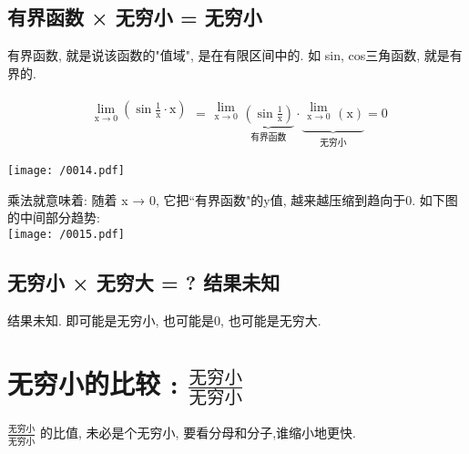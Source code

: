 \documentclass[UTF8]{ctexart}
\begin{document}
\subsection{有界函数 × 无穷小 = 无穷小 } 

有界函数, 就是说该函数的"值域", 是在有限区间中的. 如 sin, cos三角函数, 就是有界的.

\begin{myEnvSample}
	\begin{align*}  %
		\begin{matrix}
			\lim_{\text{x}\rightarrow 0}\left( \sin \frac{1}{\text{x}}\cdot \text{x} \right)\\
		\end{matrix}=\begin{matrix}
			\lim_{\text{x}\rightarrow 0}\\
		\end{matrix}\underset{\text{有界函数}}{\underbrace{\left( \sin \frac{1}{\text{x}} \right) }}\cdot \underset{\text{无穷小}}{\underbrace{\begin{matrix}
					\lim_{\text{x}\rightarrow 0}\\
				\end{matrix}\left( \text{x} \right) }}=0 
	\end{align*}
	
	\texttt{[image: /0014.pdf]}
	
	乘法就意味着: 随着 x → 0, 它把``有界函数"的y值, 越来越压缩到趋向于0. 如下图的中间部分趋势: \\
	
	\texttt{[image: /0015.pdf]}
\end{myEnvSample}


\subsection{无穷小 × 无穷大 = ?  结果未知} 

结果未知. 即可能是无穷小, 也可能是0, 也可能是无穷大.







\section{无穷小的比较 : $ \frac{\text{无穷小}} {\text{无穷小}}$ }

$ \frac{\text{无穷小}} {\text{无穷小}}$ 的比值, 未必是个无穷小, 要看分母和分子,谁缩小地更快.  
\end{document}
